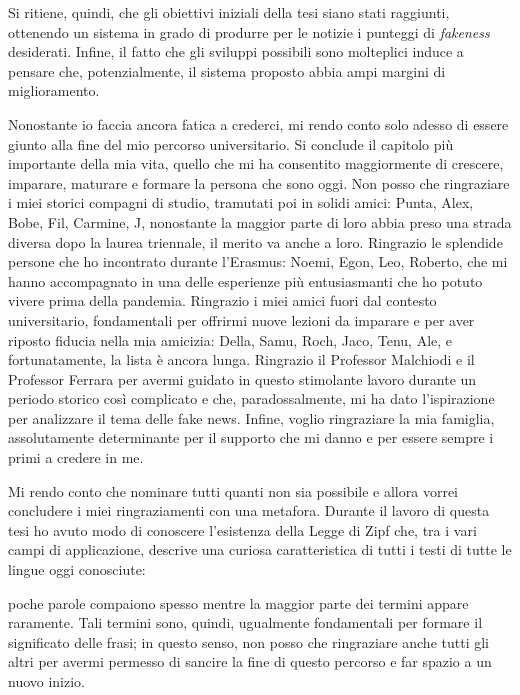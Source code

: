 \documentclass[12pt]{report}
\theoremstyle{definition}
\begin{document}
Si ritiene, quindi, che gli obiettivi iniziali della tesi siano stati raggiunti, ottenendo un sistema in grado di produrre per le notizie i punteggi di \textit{fakeness} desiderati.
Infine, il fatto che gli sviluppi possibili sono molteplici induce a pensare che, potenzialmente, il sistema proposto abbia ampi margini di miglioramento.

\printbibliography

%
Nonostante io faccia ancora fatica a crederci, mi rendo conto solo adesso di essere giunto alla fine del mio percorso universitario. Si conclude il capitolo più importante della mia vita, quello che mi ha consentito maggiormente di crescere, imparare, maturare e formare la persona che sono oggi.
Non posso che ringraziare i miei storici compagni di studio, tramutati poi in solidi amici: Punta, Alex, Bobe, Fil, Carmine, J, nonostante la maggior parte di loro abbia preso una strada diversa dopo la laurea triennale, il merito va anche a loro.
Ringrazio le splendide persone che ho incontrato durante l'Erasmus: Noemi, Egon, Leo, Roberto, che mi hanno accompagnato in una delle esperienze più entusiasmanti che ho potuto vivere prima della pandemia.
Ringrazio i miei amici fuori dal contesto universitario, fondamentali per offrirmi nuove lezioni da imparare e per aver riposto fiducia nella mia amicizia: Della, Samu, Roch, Jaco, Tenu, Ale, e fortunatamente, la lista è ancora lunga.
Ringrazio il Professor Malchiodi e il Professor Ferrara per avermi guidato in questo stimolante lavoro durante un periodo storico così complicato e che, paradossalmente, mi ha dato l'ispirazione per analizzare il tema delle fake news.
Infine, voglio ringraziare la mia famiglia, assolutamente determinante per il supporto che mi danno e per essere sempre i primi a credere in me.

Mi rendo conto che nominare tutti quanti non sia possibile e allora vorrei concludere i miei ringraziamenti con una metafora. Durante il lavoro di questa tesi ho avuto modo di conoscere l'esistenza della Legge di Zipf che, tra i vari campi di applicazione, descrive una curiosa caratteristica di tutti i testi di tutte le lingue oggi conosciute: 

poche parole compaiono spesso mentre la maggior parte dei termini appare raramente. Tali termini sono, quindi, ugualmente fondamentali per formare il significato delle frasi; in questo senso, non posso che ringraziare anche tutti gli altri per avermi permesso di sancire la fine di questo percorso e far spazio a un nuovo inizio.
\end{document}
